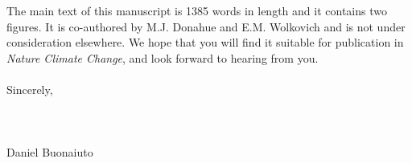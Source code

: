 \documentclass{article}[12pt]
\begin{document}
The main text of this manuscript is 1385 words in length and it contains two figures. It is co-authored by M.J. Donahue and E.M. Wolkovich and is not under consideration elsewhere. We hope that you will find it suitable for publication in \textit{Nature Climate Change}, and look forward to hearing from you.\\\
\\Sincerely,\\\\\\\\


\noindent Daniel Buonaiuto
\newpage

\end{document}
